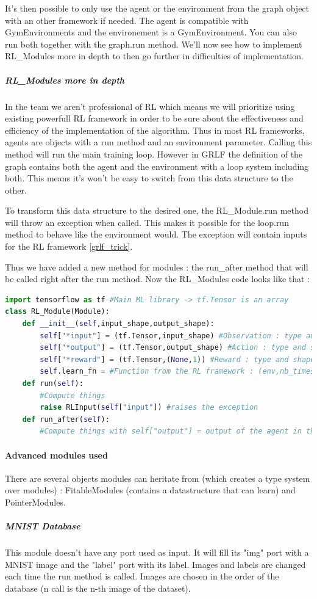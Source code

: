 \documentclass[11pt]{article}
\begin{document}
It's then possible to only use the agent or the environment from the graph object with an other framework if needed. The agent is compatible with GymEnvironments and the environement is a GymEnvironment. You can also run both together with the graph.run method. We'll now see how to implement RL\_Modules more in depth to then go further in difficulties of implementation.
\subparagraph{RL\_Modules more in depth}
In the team we aren't professional of RL which means we will prioritize using existing powerfull RL framework in order to be sure about the effectiveness and efficiency of the implementation of the algorithm. Thus in most RL frameworks, agents are objects with a run method and an environment parameter. Calling this method will run the main training loop. However in GRLF the definition of the graph contains both the agent and the environment with a loop system including both. This means it's won't be easy to switch from this data structure to the other.

To transform this data structure to the desired one, the RL\_Module.run method will throw an exception when called. This makes it possible for the loop.run method to behave like the environment would. The exception will contain inputs for the RL framework \ref{grlf_trick}.

Thus we have added a new method for modules : the run\_after method that will be called right after the run method. Now the RL\_Modules code looks like that :
\begin{lstlisting}[language=Python]
import tensorflow as tf #Main ML library -> tf.Tensor is an array
class RL_Module(Module):
	def __init__(self,input_shape,output_shape):
		self["*input"] = (tf.Tensor,input_shape) #Observation : type and shape
		self["*output"] = (tf.Tensor,output_shape) #Action : type and shape
		self["*reward"] = (tf.Tensor,(None,1)) #Reward : type and shape
		self.learn_fn = #Function from the RL framework : (env,nb_timesteps) -> object
	def run(self):
		#Compute things
		raise RLInput(self["input"]) #raises the exception
	def run_after(self):
		#Compute things with self["output"] = output of the agent in the RL framework
\end{lstlisting}
\paragraph{Advanced modules used}
There are several objects modules can heritate from (which creates a type system over modules) : FitableModules (contains a datastructure that can learn) and PointerModules.
\subparagraph{MNIST Database}
This module doesn't have any port used as input. It will fill its "img" port with a MNIST image and the "label" port with its label. Images and labels are changed each time the run method is called. Images are chosen in the order of the database (n call is the n-th image of the dataset).
\end{document}
